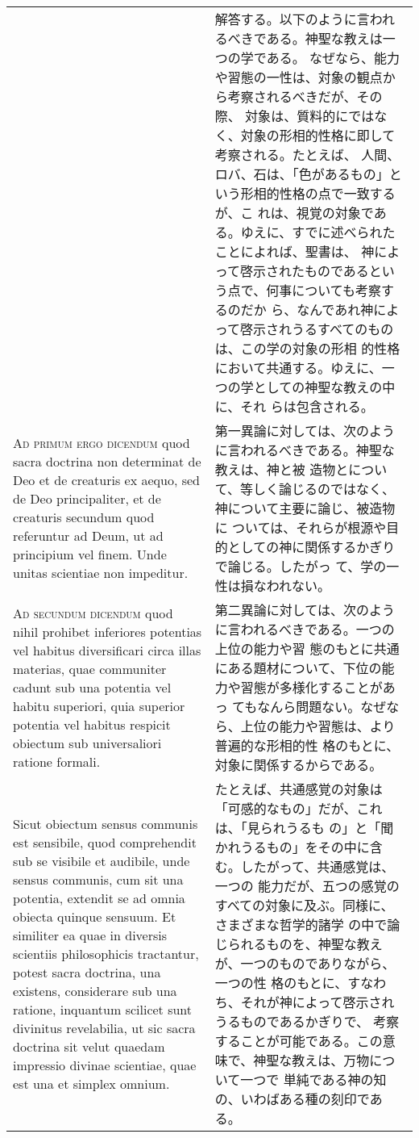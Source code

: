 \documentclass[10pt]{jsarticle}
\begin{document}
\begin{longtable}{p{21em}p{21em}}
&


解答する。以下のように言われるべきである。神聖な教えは一つの学である。
なぜなら、能力や習態の一性は、対象の観点から考察されるべきだが、その際、
対象は、質料的にではなく、対象の形相的性格に即して考察される。たとえば、
人間、ロバ、石は、「色があるもの」という形相的性格の点で一致するが、こ
れは、視覚の対象である。ゆえに、すでに述べられたことによれば、聖書は、
神によって啓示されたものであるという点で、何事についても考察するのだか
ら、なんであれ神によって啓示されうるすべてのものは、この学の対象の形相
的性格において共通する。ゆえに、一つの学としての神聖な教えの中に、それ
らは包含される。

\\


{\scshape Ad primum ergo dicendum} quod sacra doctrina non determinat
de Deo et de creaturis ex aequo, sed de Deo principaliter, et de
creaturis secundum quod referuntur ad Deum, ut ad principium vel
finem. Unde unitas scientiae non impeditur.


&

第一異論に対しては、次のように言われるべきである。神聖な教えは、神と被
造物とについて、等しく論じるのではなく、神について主要に論じ、被造物に
ついては、それらが根源や目的としての神に関係するかぎりで論じる。したがっ
て、学の一性は損なわれない。
\\


{\scshape Ad secundum dicendum} quod nihil prohibet inferiores
potentias vel habitus diversificari circa illas materias, quae
communiter cadunt sub una potentia vel habitu superiori, quia superior
potentia vel habitus respicit obiectum sub universaliori ratione
formali.


&

第二異論に対しては、次のように言われるべきである。一つの上位の能力や習
態のもとに共通にある題材について、下位の能力や習態が多様化することがあっ
てもなんら問題ない。なぜなら、上位の能力や習態は、より普遍的な形相的性
格のもとに、対象に関係するからである。

\\

Sicut obiectum sensus communis est sensibile, quod comprehendit sub se
visibile et audibile, unde sensus communis, cum sit una potentia,
extendit se ad omnia obiecta quinque sensuum. Et similiter ea quae in
diversis scientiis philosophicis tractantur, potest sacra doctrina,
una existens, considerare sub una ratione, inquantum scilicet sunt
divinitus revelabilia, ut sic sacra doctrina sit velut quaedam
impressio divinae scientiae, quae est una et simplex omnium.


&

たとえば、共通感覚の対象は「可感的なもの」だが、これは、「見られうるも
の」と「聞かれうるもの」をその中に含む。したがって、共通感覚は、一つの
能力だが、五つの感覚のすべての対象に及ぶ。同様に、さまざまな哲学的諸学
の中で論じられるものを、神聖な教えが、一つのものでありながら、一つの性
格のもとに、すなわち、それが神によって啓示されうるものであるかぎりで、
考察することが可能である。この意味で、神聖な教えは、万物について一つで
単純である神の知の、いわばある種の刻印である。



\end{longtable}
\end{document}

